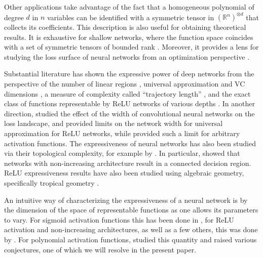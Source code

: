 \documentclass[12pt]{article}
\theoremstyle{definition}
\begin{document}
Other applications \cite{Jaffali_2020} take advantage of the fact that a homogeneous polynomial of degree $d$ in $n$ variables can be identified with a symmetric tensor in $\left(\mathbb{R}^n\right)^{\otimes d}$ that collects its coefficients. This description is also useful for obtaining theoretical results. It is exhaustive for shallow networks, where the function space coincides with a set of symmetric tensors of bounded rank \cite{KTB2019}. Moreover, it provides a lens for studying the loss surface of neural networks from an optimization perspective \cite{Venturi, arjevani2025geometryoptimizationshallowpolynomial}.

Substantial literature has shown the expressive power of deep networks from the perspective of the number of linear regions \cite{Montufar2014}, universal approximation and VC dimensions \cite{Telgarsky2016, Raghu2017}, a measure of complexity called ``trajectory length'' \cite{Mhaskar2016}, and the exact class of functions representable by ReLU networks of various depths \cite{Hertrich2023}. In another direction, \cite{Nguyen2018} studied the effect of the width of convolutional neural networks on the loss landscape, and \cite{Lu2017, Hanin2018} provided limits on the network width for universal approximation for ReLU networks, while \cite{KidgerLyons2020} provided such a limit for arbitrary activation functions. The expressiveness of neural networks has also been studied via their topological complexity, for example by \cite{bianchini2014complexity, GLMW2022}. In particular, \cite{Nguyen2018b} showed that networks with non-increasing architecture result in a connected decision region. ReLU expressiveness results have also been studied using algebraic geometry, specifically tropical geometry \cite{Brandenburg2024,GLMW2022, Hertrich2023}. 

An intuitive way of characterizing the expressiveness of a neural network is by the dimension of the space of representable functions as one allows its parameters to vary. For sigmoid activation functions this has been done in \cite{albertini1993neural}, for ReLU activation and non-increasing architectures, as well as a few others, this was done by \cite{bui2020functional, GLMW2022}. For polynomial activation functions, \cite{KTB2019, KLW2024} studied this quantity and raised various conjectures, one of which we will resolve in the present paper.
\end{document}
